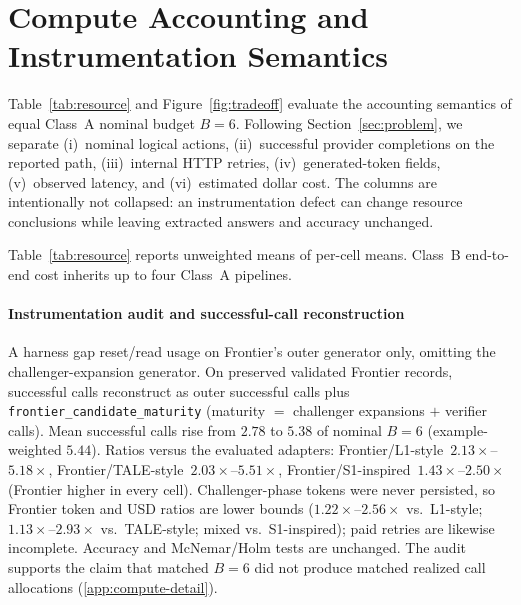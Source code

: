 \section{Compute Accounting and Instrumentation Semantics}
\label{sec:compute}

Table~\ref{tab:resource} and Figure~\ref{fig:tradeoff} evaluate the accounting semantics of equal
Class~A nominal budget $B{=}6$. Following Section~\ref{sec:problem}, we separate (i)~nominal
logical actions, (ii)~successful provider completions on the reported path, (iii)~internal HTTP
retries, (iv)~generated-token fields, (v)~observed latency, and (vi)~estimated dollar cost. The
columns are intentionally not collapsed: an instrumentation defect can change resource conclusions
while leaving extracted answers and accuracy unchanged.

\begin{table}[tbp]
\centering
\footnotesize
\setlength{\tabcolsep}{4pt}
\caption{Mean realized resources per evaluated Class~A policy across $15$ cells (nominal $B{=}6$).
Class~B pool cost inherits up to four Class~A pipelines (Table~\ref{tab:main-matrix}). USD uses a
2026-07-16 pricing snapshot. Frontier token/cost reconstruction status is documented in the table
note.}
\label{tab:resource}

\end{table}

Table~\ref{tab:resource} reports unweighted means of per-cell means. Class~B end-to-end cost
inherits up to four Class~A pipelines.

\paragraph{Instrumentation audit and successful-call reconstruction}
A harness gap reset/read usage on Frontier's outer generator only, omitting the challenger-expansion
generator. On preserved validated Frontier records, successful calls reconstruct as outer successful
calls plus \texttt{frontier\_candidate\_maturity} (maturity $=$ challenger expansions $+$ verifier
calls). Mean successful calls rise from $2.78$ to $5.38$ of nominal $B{=}6$ (example-weighted
$5.44$). Ratios versus the evaluated adapters: Frontier/L1-style~$2.13\times$--$5.18\times$,
Frontier/TALE-style~$2.03\times$--$5.51\times$, Frontier/S1-inspired~$1.43\times$--$2.50\times$
(Frontier higher in every cell). Challenger-phase tokens were never persisted, so Frontier token and
USD ratios are lower bounds ($1.22\times$--$2.56\times$ vs.\ L1-style; $1.13\times$--$2.93\times$
vs.\ TALE-style; mixed vs.\ S1-inspired); paid retries are likewise incomplete. Accuracy and
McNemar/Holm tests are unchanged. The audit supports the claim that matched $B{=}6$ did not produce
matched realized call allocations (\ref{app:compute-detail}).

